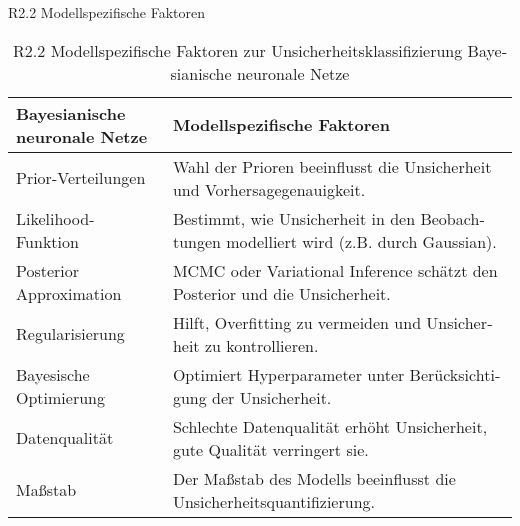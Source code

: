 \begin{otherlanguage}{ngerman}
\newline
R2.2 Modellspezifische Faktoren

\begin{table}[!htpb]
  \centering
  \begin{tabular}{|l|p{\dimexpr\textwidth-5cm-2\tabcolsep}|}
    \hline
    \textbf{\gls{Bayesianische neuronale Netze}} & \textbf{Modellspezifische Faktoren} \\
    \hline
    Prior-Verteilungen & Wahl der Prioren beeinflusst die Unsicherheit und Vorhersagegenauigkeit. \\
    \hline
    Likelihood-Funktion & Bestimmt, wie Unsicherheit in den Beobachtungen modelliert wird (z.B. durch Gaussian). \\
    \hline
    Posterior Approximation & MCMC oder Variational Inference schätzt den Posterior und die Unsicherheit. \\
    \hline
    Regularisierung & Hilft, Overfitting zu vermeiden und Unsicherheit zu kontrollieren. \\
    \hline
    Bayesische Optimierung & Optimiert Hyperparameter unter Berücksichtigung der Unsicherheit. \\
    \hline
    Datenqualität & Schlechte Datenqualität erhöht Unsicherheit, gute Qualität verringert sie. \\
    \hline
    Maßstab & Der Maßstab des Modells beeinflusst die Unsicherheitsquantifizierung. \\
    \hline
  \end{tabular}
  \caption{R2.2 Modellspezifische Faktoren zur Unsicherheitsklassifizierung \gls{Bayesianische neuronale Netze}}\label{tab:chapter6r22}
\end{table}


\end{otherlanguage}
